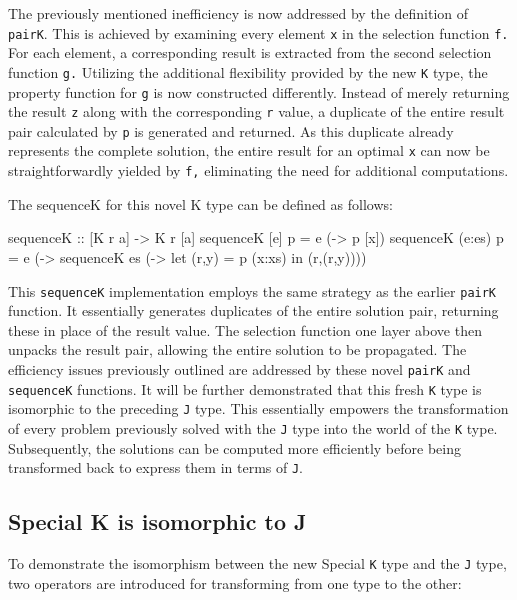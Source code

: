 \documentclass[runningheads]{llncs}
\begin{document}
The previously mentioned inefficiency is now addressed by the definition
of \texttt{pairK}. This is achieved by examining every element
\texttt{x} in the selection function \texttt{f.} For each element, a
corresponding result is extracted from the second selection function
\texttt{g.} Utilizing the additional flexibility provided by the new
\texttt{K} type, the property function for \texttt{g} is now constructed
differently. Instead of merely returning the result \texttt{z} along
with the corresponding \texttt{r} value, a duplicate of the entire
result pair calculated by \texttt{p} is generated and returned. As this
duplicate already represents the complete solution, the entire result
for an optimal \texttt{x} can now be straightforwardly yielded by
\texttt{f,} eliminating the need for additional computations.

The sequenceK for this novel K type can be defined as follows:

\begin{code}
sequenceK :: [K r a] -> K r [a]
sequenceK [e] p    = e (\x -> p [x])
sequenceK (e:es) p = e (\x -> sequenceK es 
                       (\xs -> let (r,y) = p (x:xs) 
                               in (r,(r,y))))
\end{code}

This \texttt{sequenceK} implementation employs the same strategy as the
earlier \texttt{pairK} function. It essentially generates duplicates of
the entire solution pair, returning these in place of the result value.
The selection function one layer above then unpacks the result pair,
allowing the entire solution to be propagated. The efficiency issues
previously outlined are addressed by these novel \texttt{pairK} and
\texttt{sequenceK} functions. It will be further demonstrated that this
fresh \texttt{K} type is isomorphic to the preceding \texttt{J} type.
This essentially empowers the transformation of every problem previously
solved with the \texttt{J} type into the world of the \texttt{K} type.
Subsequently, the solutions can be computed more efficiently before
being transformed back to express them in terms of \texttt{J}.

\subsection{Special K is isomorphic to
J}\label{special-k-is-isomorphic-to-j}

To demonstrate the isomorphism between the new Special \texttt{K} type
and the \texttt{J} type, two operators are introduced for transforming
from one type to the other:
\end{document}
